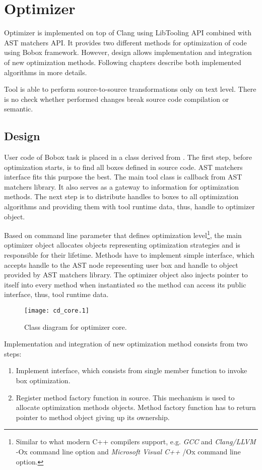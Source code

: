 \chapter{Optimizer}
Optimizer is implemented on top of Clang using LibTooling API combined with AST matchers API. It provides two different methods for optimization of code using Bobox framework. However, design allows implementation and integration of new optimization methods. Following chapters describe both implemented algorithms in more details.

Tool is able to perform source-to-source transformations only on text level. There is no check whether performed changes break source code compilation or semantic.

\section{Design}
User code of Bobox task is placed in a class derived from . The first step, before optimization starts, is to find all boxes defined in source code. AST matchers interface fits this purpose the best. The main tool  class is callback from AST matchers library. It also serves as a gateway to information for optimization methods. The next step is to distribute handles to boxes to all optimization algorithms and providing them with tool runtime data, thus, handle to optimizer object.

Based on command line parameter that defines optimization level\footnote{Similar to what modern C++ compilers support, e.g. \emph{GCC} and \emph{Clang/LLVM} -Ox command line option and \emph{Microsoft Visual C++} /Ox command line option.}, the main optimizer object allocates objects representing optimization strategies and is responsible for their lifetime. Methods have to implement simple interface, which accepts handle to the AST node representing user box and handle to  object provided by AST matchers library. The optimizer object also injects pointer to itself into every method when instantiated so the method can access its public interface, thus, tool runtime data.

\begin{figure}[h!]
	\caption{Class diagram for optimizer core.}
	\vspace{0.5cm}
	\centering
		\texttt{[image: cd\_core.1]}
\end{figure}

Implementation and integration of new optimization method consists from two steps:
\begin{enumerate}
\item Implement  interface, which consists from single member function to invoke box optimization.
\item Register method factory function in  source. This mechanism is used to allocate optimization methods objects. Method factory function has to return pointer to method object giving up its ownership.
\end{enumerate}

